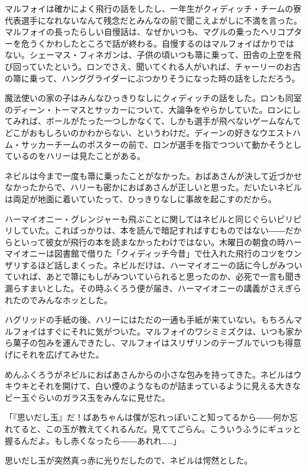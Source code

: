 \documentclass[10pt,a4paper]{article}
\begin{document}
\begin{CJK}{UTF8}{min}
マルフォイは確かによく飛行の話をしたし、一年生がクィディッチ・チームの寮代表選手になれないなんて残念だとみんなの前で聞こえよがしに不満を言った。マルフォイの長ったらしい自慢話は、なぜかいつも、マグルの乗ったヘリコプターを危うくかわしたところで話が終わる。自慢するのはマルフォイばかりではない。シェーマス・フィネガンは、子供の頃いつも箒に乗って、田舎の上空を飛び回っていたという。ロンでさえ、聞いてくれる人がいれば、チャーリーのお古の箒に乗って、ハンググライダーにぶつかりそうになった時の話をしただろう。

魔法使いの家の子はみんなひっきりなしにクィディッチの話をした。ロンも同室のディーン・トーマスとサッカーについて、大論争をやらかしていた。ロンにしてみれば、ボールがたった一つしかなくて、しかも選手が飛べないゲームなんてどこがおもしろいのかわからない、というわけだ。ディーンの好きなウエストハム・サッカーチームのポスターの前で、ロンが選手を指でつついて動かそうとしているのをハリーは見たことがある。

ネビルは今まで一度も箒に乗ったことがなかった。おばあさんが決して近づかせなかったからで、ハリーも密かにおばあさんが正しいと思った。だいたいネビルは両足が地面に着いていたって、ひっきりなしに事故を起こすのだから。

ハーマイオニー・グレンジャーも飛ぶことに関してはネビルと同じぐらいピリピリしていた。こればっかりは、本を読んで暗記すればすむものではない――だからといって彼女が飛行の本を読まなかったわけではない。木曜日の朝食の時ハーマイオニーは図書館で借りた「クィディッチ今昔」で仕入れた飛行のコツをウンザリするほど話しまくった。ネビルだけは、ハーマイオニーの話に今しがみついていれば、あとで箒にもしがみついていられると思ったのか、必死で一言も聞き漏らすまいとした。その時ふくろう便が届き、ハーマイオニーの講義がさえぎられたのでみんなホッとした。

ハグリッドの手紙の後、ハリーにはただの一通も手紙が来ていない。もちろんマルフォイはすぐにそれに気がついた。マルフォイのワシミミズクは、いつも家から菓子の包みを運んできたし、マルフォイはスリザリンのテーブルでいつも得意げにそれを広げてみせた。

めんふくろうがネビルにおばあさんからの小さな包みを持ってきた。ネビルはウキウキとそれを開けて、白い煙のようなものが詰まっているように見える大きなビー玉ぐらいのガラス玉をみんなに見せた。

「『思いだし玉』だ！ばあちゃんは僕が忘れっぽいこと知ってるから――何か忘れてると、この玉が教えてくれるんだ。見ててごらん。こういうふうにギュッと握るんだよ。もし赤くなったら――あれれ……」

思いだし玉が突然真っ赤に光りだしたので、ネビルは愕然とした。


\end{CJK}
\end{document}
